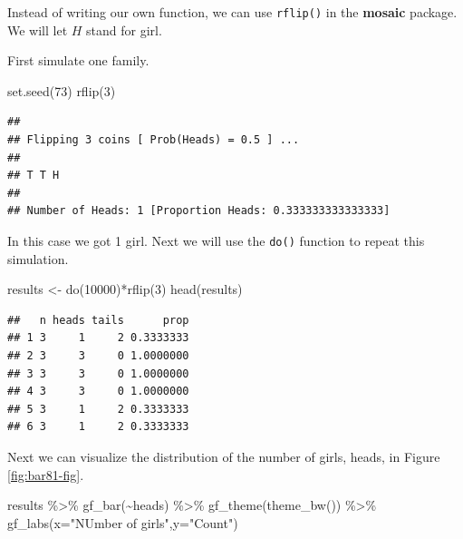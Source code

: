 \documentclass[
]{book}
\newenvironment{Shaded}{\begin{snugshade}}{\end{snugshade}}
\newcommand{\AttributeTok}[1]{\textcolor[rgb]{0.77,0.63,0.00}{#1}}
\newcommand{\DecValTok}[1]{\textcolor[rgb]{0.00,0.00,0.81}{#1}}
\newcommand{\FunctionTok}[1]{\textcolor[rgb]{0.00,0.00,0.00}{#1}}
\newcommand{\NormalTok}[1]{#1}
\newcommand{\OtherTok}[1]{\textcolor[rgb]{0.56,0.35,0.01}{#1}}
\newcommand{\SpecialCharTok}[1]{\textcolor[rgb]{0.00,0.00,0.00}{#1}}
\newcommand{\StringTok}[1]{\textcolor[rgb]{0.31,0.60,0.02}{#1}}
\begin{document}
Instead of writing our own function, we can use \texttt{rflip()} in the \textbf{mosaic} package. We will let \(H\) stand for girl.

First simulate one family.

\begin{Shaded}
\begin{Highlighting}[]
\FunctionTok{set.seed}\NormalTok{(}\DecValTok{73}\NormalTok{)}
\FunctionTok{rflip}\NormalTok{(}\DecValTok{3}\NormalTok{)}
\end{Highlighting}
\end{Shaded}

\begin{verbatim}
## 
## Flipping 3 coins [ Prob(Heads) = 0.5 ] ...
## 
## T T H
## 
## Number of Heads: 1 [Proportion Heads: 0.333333333333333]
\end{verbatim}

In this case we got 1 girl. Next we will use the \texttt{do()} function to repeat this simulation.

\begin{Shaded}
\begin{Highlighting}[]
\NormalTok{results }\OtherTok{\textless{}{-}} \FunctionTok{do}\NormalTok{(}\DecValTok{10000}\NormalTok{)}\SpecialCharTok{*}\FunctionTok{rflip}\NormalTok{(}\DecValTok{3}\NormalTok{)}
\FunctionTok{head}\NormalTok{(results)}
\end{Highlighting}
\end{Shaded}

\begin{verbatim}
##   n heads tails      prop
## 1 3     1     2 0.3333333
## 2 3     3     0 1.0000000
## 3 3     3     0 1.0000000
## 4 3     3     0 1.0000000
## 5 3     1     2 0.3333333
## 6 3     1     2 0.3333333
\end{verbatim}

Next we can visualize the distribution of the number of girls, heads, in Figure \ref{fig:bar81-fig}.

\begin{Shaded}
\begin{Highlighting}[]
\NormalTok{results }\SpecialCharTok{\%\textgreater{}\%}
  \FunctionTok{gf\_bar}\NormalTok{(}\SpecialCharTok{\textasciitilde{}}\NormalTok{heads) }\SpecialCharTok{\%\textgreater{}\%}
  \FunctionTok{gf\_theme}\NormalTok{(}\FunctionTok{theme\_bw}\NormalTok{()) }\SpecialCharTok{\%\textgreater{}\%}
  \FunctionTok{gf\_labs}\NormalTok{(}\AttributeTok{x=}\StringTok{"NUmber of girls"}\NormalTok{,}\AttributeTok{y=}\StringTok{"Count"}\NormalTok{)}
\end{Highlighting}
\end{Shaded}
\end{document}
